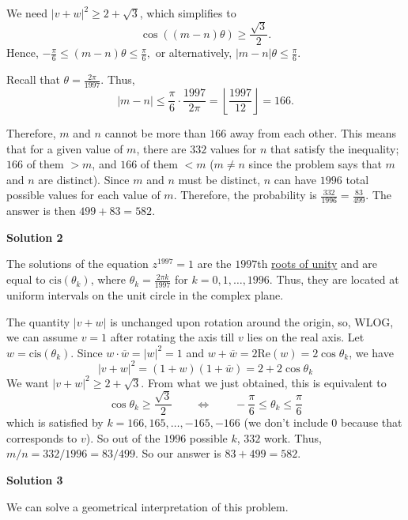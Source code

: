 \begin{enumerate}
 We need $|v+w|^2 \ge 2+\sqrt{3}$, which simplifies to 
 \[\cos((m-n)\theta) \ge \frac{\sqrt{3}}{2}.\] Hence, $-\frac{\pi}{6} \le (m-n) \theta \le \frac{\pi}{6},$ or alternatively, $|m - n| \theta \le \frac{\pi}{6}.$ 

 Recall that $\theta=\frac{2\pi}{1997}.$ Thus, 
 \[|m - n| \le \frac{\pi}{6} \cdot \frac{1997}{2 \pi} = \left\lfloor \frac{1997}{12} \right\rfloor =166.\]

 Therefore, $m$ and $n$ cannot be more than $166$ away from each other.  This means that for a given value of $m$, there are $332$ values for $n$ that satisfy the inequality; $166$ of them $> m$, and $166$ of them $< m$ ($m \neq n$ since the problem says that $m$ and $n$ are distinct).  Since $m$ and $n$ must be distinct, $n$ can have $1996$ total possible values for each value of $m$.  Therefore, the probability is $\frac{332}{1996}=\frac{83}{499}$.  The answer is then $499+83=\boxed{582}$.

 



\textbf{Solution 2}

The solutions of the equation $z^{1997} = 1$ are the $1997$th \href{https://artofproblemsolving.com/wiki/index.php?title=Roots\_of\_unity}{roots of unity} and are equal to $\text{cis}(\theta_k)$, where $\theta_k = \frac {2\pi k}{1997}$ for $k = 0,1,\ldots,1996.$ Thus, they are located at uniform intervals on the unit circle in the complex plane. 

 The quantity $|v+w|$ is unchanged upon rotation around the origin, so, WLOG, we can assume $v=1$ after rotating the axis till $v$ lies on the real axis. Let $w=\text{cis}(\theta_k)$. Since $w\cdot \overline{w}=|w|^2=1$ and $w+\overline{w}=2\text{Re}(w) = 2\cos\theta_k$, we have 
 \[|v + w|^2  =  (1+w)(1+\overline{w}) = 2+2\cos\theta_k\]We want $|v + w|^2\ge 2 + \sqrt {3}.$  From what we just obtained, this is equivalent to 
 \[\cos\theta_k\ge \frac {\sqrt {3}}2 \qquad \Leftrightarrow \qquad -\frac {\pi}6\le \theta_k \le  \frac {\pi}6\] which is satisfied by $k = 166,165,\ldots, - 165, - 166$ (we don't include 0 because that corresponds to $v$).  So out of the $1996$ possible $k$, $332$ work.  Thus, $m/n = 332/1996 = 83/499.$  So our answer is $83 + 499 = \boxed{582}.$




\textbf{Solution 3}

We can solve a geometrical interpretation of this problem.


\end{enumerate}
